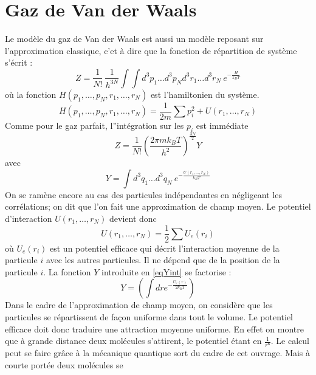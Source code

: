 \documentclass[12pt]{book}
\begin{document}
\section{Gaz de Van der Waals}\label{secvanderwaals}
Le mod\`ele du gaz de Van der Waals est
aussi un mod\`ele reposant sur 
l'approximation classique, c'et \`a dire que la fonction de
r\'epartition de syst\`eme s'\'ecrit :
\begin{equation}
Z=\frac{1}{N!}\ \frac{1}{h^{3N}}\int\int d^3p_1\dots d^3p_N
d^3r_1\dots d^3r_N \ e^{-\frac{H}{k_BT}}
\end{equation}
o\`u la fonction $H(p_1 ,\dots ,p_N,r_1 ,\dots ,r_N)$ est
l'hamiltonien du syst\`eme.
\begin{equation}
H(p_1 ,\dots ,p_N,r_1 ,\dots ,r_N) = \frac{1}{2m}\sum p_i^2+U(r_1
,\dots,r_N)  
\end{equation}
Comme pour le gaz parfait, l''int\'egration sur les $p_i$ est imm\'ediate 
\begin{equation}
Z=\frac{1}{N!}\left(\frac{2\pi m k_BT }{h^2}\right)^{\frac{3N}{2}}Y
\end{equation}
avec
\begin{equation}\label{eqYint}
Y=\int d^3q_1\dots d^3q_N\  e^{-\frac{U(r_1,\dots,r_N)}{k_BT}}
\end{equation}
On se ram\`ene encore au cas des particules ind\'ependantes en
n\'egligeant les corr\'elations; on dit que l'on fait une
approximation de champ moyen. Le potentiel d'interaction
$U(r_1,\dots,r_N)$ devient donc 
\begin{equation}
U(r_1,\dots,r_N) =\frac{1}{2}\sum U_{e}(r_i)
\end{equation}
o\`u $U_e(r_i)$ est un potentiel efficace qui d\'ecrit l'interaction
moyenne de la particule $i$ avec les autres particules. Il ne d\'epend
que de la position de la particule $i$.
La fonction $Y$ introduite en \ref{eqYint} se factorise :
\begin{equation}
Y=\left(\int dr e^{-\frac{U_{e}(r)}{2k_BT}}\right)
\end{equation}
Dans le cadre de l'approximation de champ moyen, on consid\`ere que
les particules se r\'epartissent de fa\c con uniforme dans tout le
volume. Le potentiel efficace doit donc traduire une attraction
moyenne uniforme. En effet on montre que \`a grande distance deux
mol\'ecules s'attirent, le potentiel \'etant en $\frac{1}{r^6}$. Le
calcul peut se faire gr\^ace \`a la m\'ecanique quantique sort du
cadre de cet ouvrage. Mais \`a courte port\'ee deux mol\'ecules se
\end{document}
